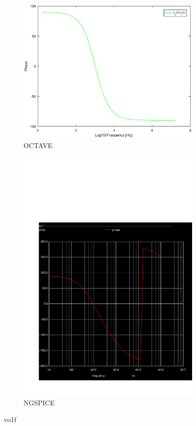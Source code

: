 
\begin{figure}[H] 
\centering
\begin{subfigure}{0.3\textwidth}
\includegraphics[width=\textwidth]{phase.eps}
\caption{OCTAVE}
\label{Octave_vo1f}
\end{subfigure}
\begin{subfigure}{0.3\textwidth}
\includegraphics[width=\textwidth]{phase.pdf}
\caption{NGSPICE}
\label{Ngspice_vo1f}
\end{subfigure}
\caption{vo1f}
\end{figure}

